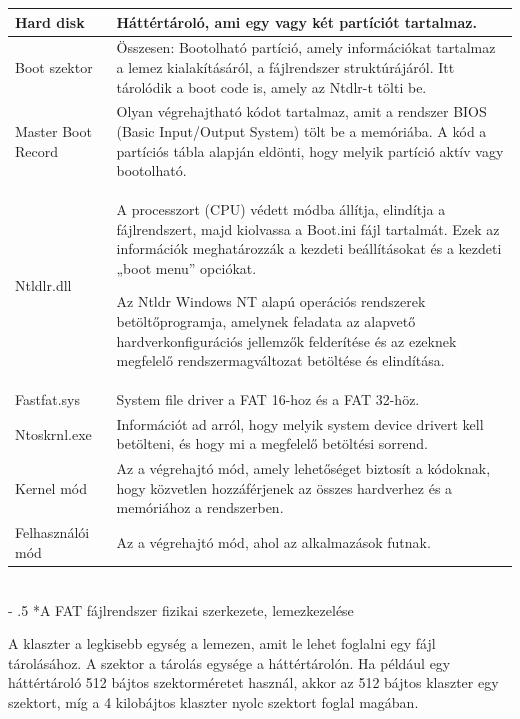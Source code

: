 \documentclass[tikz,12pt,margin=0px]{article}
\makeatletter
\renewcommand\paragraph{%
	\@startsection{paragraph}{4}{0mm}%
	{-\baselineskip}%
	{.5\baselineskip}%
	{\normalfont\normalsize\bfseries}}
\makeatother
\begin{document}
    \renewcommand{\arraystretch}{2}
    {\footnotesize
      \begin{tabular}{|p{6cm}|p{8cm}|} \hline
      Hard disk & Háttértároló, ami egy vagy két partíciót tartalmaz. \\ \hline
      Boot szektor & Összesen: Bootolható partíció, amely információkat tartalmaz a lemez kialakításáról, a fájlrendszer struktúrájáról. Itt tárolódik a boot code is, amely az Ntdlr-t tölti be. \\ \hline
      Master Boot Record & Olyan végrehajtható kódot tartalmaz, amit a rendszer BIOS (Basic Input/Output System) tölt be a memóriába. A kód a partíciós tábla alapján eldönti, hogy melyik partíció aktív vagy bootolható. \\ \hline
      Ntldlr.dll & A processzort (CPU) védett módba állítja, elindítja a fájlrendszert, majd kiolvassa a Boot.ini fájl tartalmát. Ezek az információk meghatározzák a kezdeti beállításokat és a kezdeti „boot menu” opciókat.

Az Ntldr Windows NT alapú operációs rendszerek betöltőprogramja, amelynek feladata az alapvető hardverkonfigurációs jellemzők felderítése és az ezeknek megfelelő rendszermagváltozat betöltése és elindítása. \\ \hline
      Fastfat.sys & System file driver a FAT 16-hoz és a FAT 32-höz.  \\ \hline
      Ntoskrnl.exe & Információt ad arról, hogy melyik system device drivert kell betölteni, és hogy mi a megfelelő betöltési sorrend. \\ \hline
      Kernel mód & Az a végrehajtó mód, amely lehetőséget biztosít a kódoknak, hogy közvetlen hozzáférjenek az összes hardverhez és a memóriához a rendszerben. \\ \hline
      Felhasználói mód & Az a végrehajtó mód, ahol az alkalmazások futnak. \\ \hline
      \end{tabular}
    }
    \renewcommand{\arraystretch}{1}\\

    \paragraph*{A FAT fájlrendszer fizikai szerkezete, lemezkezelése}

    \noindent A klaszter a legkisebb egység a lemezen, amit le lehet foglalni egy fájl tárolásához. A szektor a tárolás egysége a háttértárolón. Ha például egy háttértároló 512 bájtos szektorméretet használ, akkor az 512 bájtos klaszter egy szektort, míg a 4 kilobájtos klaszter nyolc szektort foglal magában.\\
\end{document}
